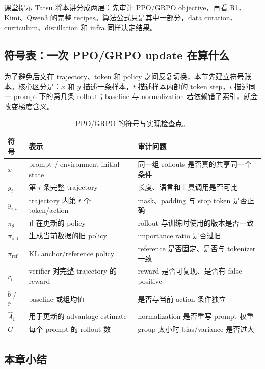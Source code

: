 \documentclass[a4paper]{article}
\begin{document}
\begin{knowledgebox}{课堂提示}
Tatsu 将本讲分成两层：先审计 PPO/GRPO objective，再看 R1、Kimi、Qwen3 的完整 recipes。算法公式只是其中一部分，data curation、curriculum、distillation 和 infra 同样决定结果。
\end{knowledgebox}

\subsection{符号表：一次 PPO/GRPO update 在算什么}

为了避免后文在 trajectory、token 和 policy 之间反复切换，本节先建立符号账本。核心区分是：$x$ 和 $y$ 描述一条样本，$t$ 描述样本内部的 token step，$i$ 描述同一 prompt 下的第几条 rollout；baseline 与 normalization 若依赖错了索引，就会改变梯度含义。

\begin{table}[H]
\centering
\begin{tabular}{L{0.14\textwidth}L{0.34\textwidth}L{0.42\textwidth}}
\toprule
符号 & 表示 & 审计问题 \\
\midrule
$x$ & prompt / environment initial state & 同一组 rollouts 是否真的共享同一个条件 \\
$y_i$ & 第 $i$ 条完整 trajectory & 长度、语言和工具调用是否可比 \\
$y_{i,t}$ & trajectory 内第 $t$ 个 token/action & mask、padding 与 stop token 是否正确 \\
$\pi_\theta$ & 正在更新的 policy & rollout 与训练时使用的版本是否一致 \\
$\pi_{\mathrm{old}}$ & 生成当前数据的旧 policy & importance ratio 是否过旧 \\
$\pi_{\mathrm{ref}}$ & KL anchor/reference policy & reference 是否固定、是否与 tokenizer 一致 \\
$r_i$ & verifier 对完整 trajectory 的 reward & reward 是否可复现、是否有 false positive \\
$b$ / $\bar r$ & baseline 或组均值 & 是否与当前 action 条件独立 \\
$\hat A_i$ & 用于更新的 advantage estimate & normalization 是否重写 prompt 权重 \\
$G$ & 每个 prompt 的 rollout 数 & group 太小时 bias/variance 是否过大 \\
\bottomrule
\end{tabular}
\caption{PPO/GRPO 的符号与实现检查点。}
\end{table}

\subsection{本章小结}
\end{document}
